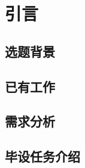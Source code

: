 

\chapter{引言}
\label{cha:intro}



\section{选题背景}
\label{sec:background}


\section{已有工作}
\label{sec:previouswork}


\section{需求分析}
\label{sec:requirements}


\section{毕设任务介绍}
\label{sec:workbrief}


